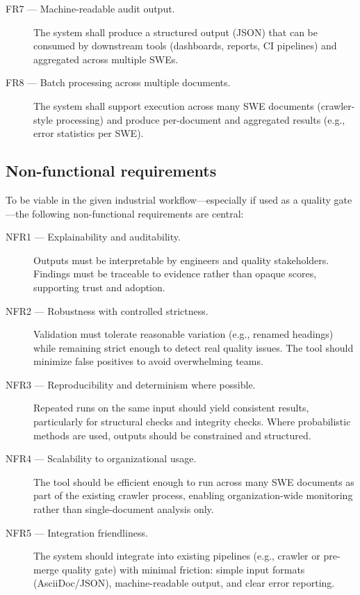 \begin{description}
    \item[FR7 --- Machine-readable audit output.] The system shall produce a structured output (JSON) that can be consumed by downstream tools (dashboards, reports, CI pipelines) and aggregated across multiple SWEs.

    \item[FR8 --- Batch processing across multiple documents.] The system shall support execution across many SWE documents (crawler-style processing) and produce per-document and aggregated results (e.g., error statistics per SWE).
\end{description}

\subsection{Non-functional requirements}
To be viable in the given industrial workflow—especially if used as a quality gate—the following non-functional requirements are central:

\begin{description}
    \item[NFR1 --- Explainability and auditability.] Outputs must be interpretable by engineers and quality stakeholders. Findings must be traceable to evidence rather than opaque scores, supporting trust and adoption.

    \item[NFR2 --- Robustness with controlled strictness.] Validation must tolerate reasonable variation (e.g., renamed headings) while remaining strict enough to detect real quality issues. The tool should minimize false positives to avoid overwhelming teams.

    \item[NFR3 --- Reproducibility and determinism where possible.] Repeated runs on the same input should yield consistent results, particularly for structural checks and integrity checks. Where probabilistic methods are used, outputs should be constrained and structured.

    \item[NFR4 --- Scalability to organizational usage.] The tool should be efficient enough to run across many SWE documents as part of the existing crawler process, enabling organization-wide monitoring rather than single-document analysis only.

    \item[NFR5 --- Integration friendliness.] The system should integrate into existing pipelines (e.g., crawler or pre-merge quality gate) with minimal friction: simple input formats (AsciiDoc/JSON), machine-readable output, and clear error reporting.
\end{description}
